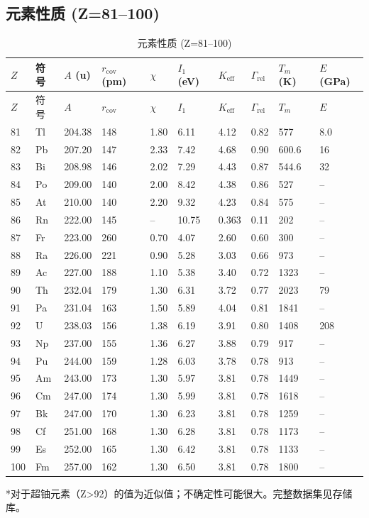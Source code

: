 \documentclass[12pt,a4paper]{article}
\newcommand{\Keff}{K_{\mathrm{eff}}}
\begin{document}
	\subsection*{元素性质 (Z=81–100)}
	
	\begin{longtable}{p{0.6cm}p{1.2cm}p{1.2cm}p{1.2cm}p{1.2cm}p{1.2cm}p{1.5cm}p{1.2cm}p{1.2cm}p{1.2cm}}
		\caption{元素性质 (Z=81–100)} \label{tab:elem-data-81to100} \\
		\toprule
		\(Z\) & 符号 & \(A\) (u) & \(r_{\text{cov}}\) (pm) & \(\chi\) & \(I_1\) (eV) & \(\Keff\) & \(\Gamma_{\text{rel}}\) & \(T_m\) (K) & \(E\) (GPa) \\
		\midrule
		\endfirsthead
		\toprule
		\(Z\) & 符号 & \(A\) & \(r_{\text{cov}}\) & \(\chi\) & \(I_1\) & \(\Keff\) & \(\Gamma_{\text{rel}}\) & \(T_m\) & \(E\) \\
		\midrule
		\endhead
		81 & Tl & 204.38 & 148 & 1.80 & 6.11 & 4.12 & 0.82 & 577 & 8.0 \\
		82 & Pb & 207.20 & 147 & 2.33 & 7.42 & 4.68 & 0.90 & 600.6 & 16 \\
		83 & Bi & 208.98 & 146 & 2.02 & 7.29 & 4.43 & 0.87 & 544.6 & 32 \\
		84 & Po & 209.00 & 140 & 2.00 & 8.42 & 4.38 & 0.86 & 527 & – \\
		85 & At & 210.00 & 140 & 2.20 & 9.32 & 4.23 & 0.84 & 575 & – \\
		86 & Rn & 222.00 & 145 & –    & 10.75 & 0.363 & 0.11 & 202 & – \\
		87 & Fr & 223.00 & 260 & 0.70 & 4.07 & 2.60 & 0.60 & 300 & – \\
		88 & Ra & 226.00 & 221 & 0.90 & 5.28 & 3.03 & 0.66 & 973 & – \\
		89 & Ac & 227.00 & 188 & 1.10 & 5.38 & 3.40 & 0.72 & 1323 & – \\
		90 & Th & 232.04 & 179 & 1.30 & 6.31 & 3.72 & 0.77 & 2023 & 79 \\
		91 & Pa & 231.04 & 163 & 1.50 & 5.89 & 4.04 & 0.81 & 1841 & – \\
		92 & U  & 238.03 & 156 & 1.38 & 6.19 & 3.91 & 0.80 & 1408 & 208 \\
		93 & Np & 237.00 & 155 & 1.36 & 6.27 & 3.88 & 0.79 & 917 & – \\
		94 & Pu & 244.00 & 159 & 1.28 & 6.03 & 3.78 & 0.78 & 913 & – \\
		95 & Am & 243.00 & 173 & 1.30 & 5.97 & 3.81 & 0.78 & 1449 & – \\
		96 & Cm & 247.00 & 174 & 1.30 & 5.99 & 3.81 & 0.78 & 1618 & – \\
		97 & Bk & 247.00 & 170 & 1.30 & 6.23 & 3.81 & 0.78 & 1259 & – \\
		98 & Cf & 251.00 & 168 & 1.30 & 6.28 & 3.81 & 0.78 & 1173 & – \\
		99 & Es & 252.00 & 165 & 1.30 & 6.42 & 3.81 & 0.78 & 1133 & – \\
		100& Fm & 257.00 & 162 & 1.30 & 6.50 & 3.81 & 0.78 & 1800 & – \\
		\bottomrule
	\end{longtable}
	*对于超铀元素（Z>92）的值为近似值；不确定性可能很大。完整数据集见存储库。
	
\end{document}
